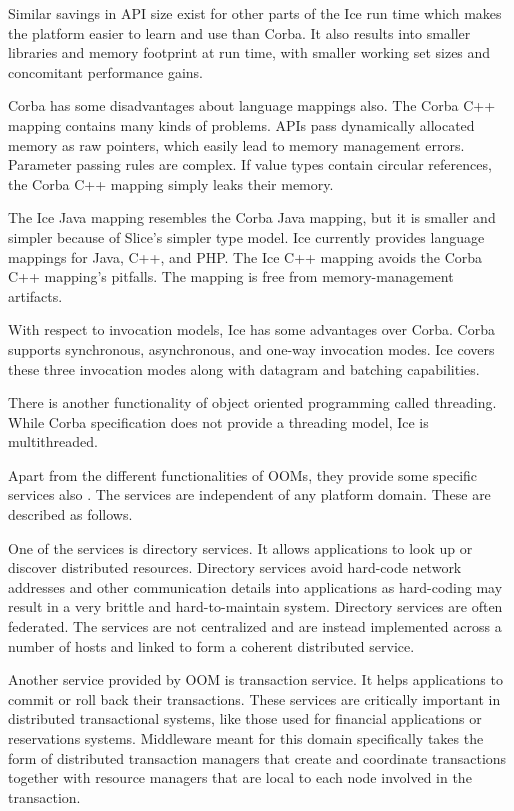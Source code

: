 \documentclass{acm_proc_article-sp}
\begin{document}
Similar savings in API size exist for other parts of the Ice run time which makes the platform easier to learn and use than Corba. It also results into smaller libraries and memory footprint at run time, with smaller working set sizes and concomitant performance gains. 

Corba has some disadvantages about language mappings also. The Corba C++ mapping contains many kinds of problems. APIs pass dynamically allocated memory as raw pointers, which easily lead to memory management errors. Parameter passing rules are complex. If value types contain circular references, the Corba C++ mapping simply leaks their memory.  

The Ice Java mapping resembles the Corba Java mapping, but it is smaller and simpler because of Slice's simpler type model. Ice currently provides language mappings for Java, C++, and PHP. The Ice C++ mapping avoids the Corba C++ mapping's pitfalls. The mapping is free from memory-management artifacts. 

With respect to invocation models, Ice has some advantages over Corba. Corba supports synchronous, asynchronous, and one-way invocation modes. Ice covers these three invocation modes along with datagram and batching capabilities. 

There is another functionality of object oriented programming called threading. While Corba specification does not provide a threading model, Ice is multithreaded.

Apart from the different functionalities of OOMs, they provide some specific services also \cite{Vinoski:2004p8371}. The services are independent of any platform domain. These are described as follows.

One of the services is directory services. It allows applications to look up or discover distributed resources. Directory services avoid hard-code network addresses and other communication details into applications as hard-coding may result in a very brittle and hard-to-maintain system. Directory services are often federated. The services are not centralized and are instead implemented across a number of hosts and linked to form a coherent distributed service.

Another service provided by OOM is transaction service. It helps applications to commit or roll back their transactions.
These services are critically important in distributed transactional systems, like those used for financial applications or reservations systems. Middleware meant for this domain specifically takes the form of distributed transaction managers that create and coordinate transactions together with resource managers that are local to each node involved in the transaction.
\end{document}
